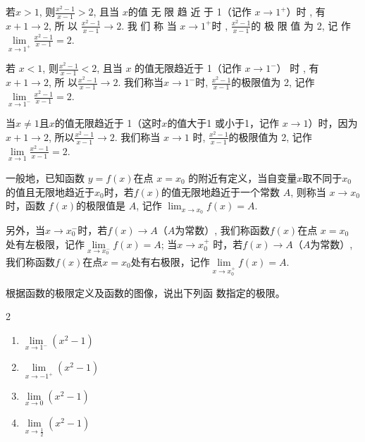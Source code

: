 \begin{figure}[htp]
    \centering
{}
    \caption{}
\end{figure}

若$x> 1$, 则$\frac {x^{2}- 1}{x- 1}> 2$, 且当 $x$的值 无 限 趋 近 于 1（记作 $x\to 1^{+ }$）时 , 有 $x+ 1\to 2$, 所 以 $\frac {x^{2}- 1}{x- 1}\to 2$. 我 们 称 当  $x\to 1^{+ }$时 , $\frac {x^{2}- 1}{x- 1}$的 极 限 值 为  2, 记 作
$\lim\limits_{x\to1^+}\frac{x^2-1}{x-1}=2$.

若 $x<1$, 则$\frac{x^{2}-1}{x-1}<2$, 且当 $x$ 的值无限趋近于 1（记作
$x\to 1^{- }$） 时 , 有$x+ 1\to 2$, 所 以$\frac {x^{2}- 1}{x- 1}\to 2$. 我们称当$x\to1^-$时, 
$\frac{x^2-1}{x-1}$的极限值为 2, 记作$\lim\limits_{x\to1^-}\frac{x^2-1}{x-1}=2$.

当$x\neq1$且$x$的值无限趋近于 1（这时$x$的值大于1 或小于1，记作 $x\to1$）时，因为 $x+1\to2$, 所以$\frac{x^{2}-1}{x-1}\to2$. 我们称当
$x\to1$ 时, $\frac{x^{2}-1}{x-1}$的极限值为 2, 记作$\lim\limits_{x\to1}\frac{x^{2}-1}{x-1}=2$.

一般地，已知函数 $y=f(x)$在点 $x=x_0$ 的附近有定义，当自变量$x$取不同于$x_0$的值且无限地趋近于$x_0$时，若$f(x)$的值无限地趋近于一个常数 $A$, 则称当 $x\to x_0$ 时，函数 $f(x)$的极限值是 $A$, 记作 $\lim_{x\to x_0}\limits f(x)=A$.

另外，当$x\to x_0^-$时，若$f(x)\to A$（$A$为常数）, 我们称函数$f(x)$在点 $x=x_0$ 处有左极限，记作$\lim\limits_{x\to x_{0}^-}f(x)=A$; 当$x\to x_{0}^{+}$ 时，若$f(x)\to A$（$A$为常数）, 我们称函数$f(x)$在点$x=x_0$处有右极限，记作$\lim\limits_{x\to x^+_0}f(x)=A$.

\begin{example}
根据函数的极限定义及函数的图像，说出下列函
数指定的极限。
\begin{multicols}{2}
\begin{enumerate}[(1)]
    \item $ \lim\limits _{x\to 1^{- }}\left ( x^{2}- 1\right )$
    \item $\lim\limits _{x\to - 1^{+ }}\left ( x^{2}- 1\right )$
    \item $\lim\limits _{x\to 0}( x^{2}- 1)$
    \item $\lim\limits _{x\to \tfrac 12}( x^{2}- 1) $
\end{enumerate}
\end{multicols}
\end{example}

